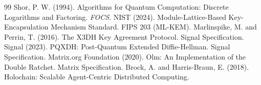 \documentclass[11pt,twocolumn]{article}
\begin{document}
\begin{thebibliography}{99}
   Shor, P. W. (1994). Algorithms for Quantum Computation:
    Discrete Logarithms and Factoring. \textit{FOCS}.
   NIST (2024). Module-Lattice-Based Key-Encapsulation
    Mechanism Standard. FIPS 203 (ML-KEM).
   Marlinspike, M. and Perrin, T. (2016). The X3DH Key
    Agreement Protocol. Signal Specification.
   Signal (2023). PQXDH: Post-Quantum Extended
    Diffie-Hellman. Signal Specification.
   Matrix.org Foundation (2020). Olm: An Implementation of
    the Double Ratchet. Matrix Specification.
   Brock, A. and Harris-Braun, E. (2018). Holochain:
    Scalable Agent-Centric Distributed Computing.
\end{thebibliography}
\end{document}
